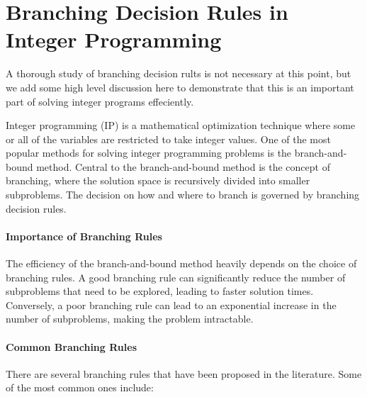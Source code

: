 

\section{Branching Decision Rules in Integer Programming}
\begin{outcome}
A thorough study of branching decision rults is not necessary at this point, but we add some high level discussion here to demonstrate that this is an important part of solving integer programs effeciently.
\end{outcome}

Integer programming (IP) is a mathematical optimization technique where some or all of the variables are restricted to take integer values. One of the most popular methods for solving integer programming problems is the branch-and-bound method. Central to the branch-and-bound method is the concept of branching, where the solution space is recursively divided into smaller subproblems. The decision on how and where to branch is governed by branching decision rules.

\paragraph{Importance of Branching Rules}

The efficiency of the branch-and-bound method heavily depends on the choice of branching rules. A good branching rule can significantly reduce the number of subproblems that need to be explored, leading to faster solution times. Conversely, a poor branching rule can lead to an exponential increase in the number of subproblems, making the problem intractable.

\paragraph{Common Branching Rules}

There are several branching rules that have been proposed in the literature. Some of the most common ones include:

